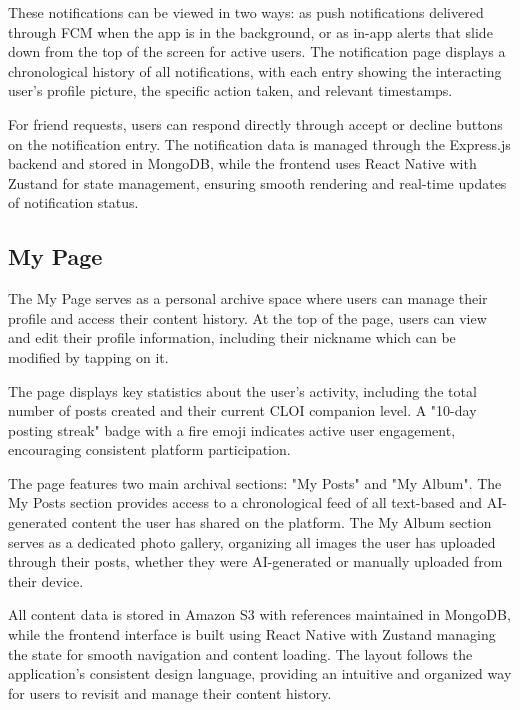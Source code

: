 \documentclass[conference]{IEEEtran}
\begin{document}
        These notifications can be viewed in two ways: as push notifications delivered through FCM when the app is in the background, or as in-app alerts that slide down from the top of the screen for active users. The notification page displays a chronological history of all notifications, with each entry showing the interacting user's profile picture, the specific action taken, and relevant timestamps.

        For friend requests, users can respond directly through accept or decline buttons on the notification entry. The notification data is managed through the Express.js backend and stored in MongoDB, while the frontend uses React Native with Zustand for state management, ensuring smooth rendering and real-time updates of notification status.

    \subsection{My Page}
        The My Page serves as a personal archive space where users can manage their profile and access their content history. At the top of the page, users can view and edit their profile information, including their nickname which can be modified by tapping on it.

        The page displays key statistics about the user's activity, including the total number of posts created and their current CLOI companion level. A "10-day posting streak" badge with a fire emoji indicates active user engagement, encouraging consistent platform participation.

        The page features two main archival sections: "My Posts" and "My Album". The My Posts section provides access to a chronological feed of all text-based and AI-generated content the user has shared on the platform. The My Album section serves as a dedicated photo gallery, organizing all images the user has uploaded through their posts, whether they were AI-generated or manually uploaded from their device.

        All content data is stored in Amazon S3 with references maintained in MongoDB, while the frontend interface is built using React Native with Zustand managing the state for smooth navigation and content loading. The layout follows the application's consistent design language, providing an intuitive and organized way for users to revisit and manage their content history.
\end{document}
